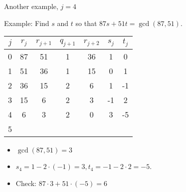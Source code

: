 \documentclass[handout]{beamer}
\begin{document}
\begin{frame}{Another example, $j=4$}

Example: Find $s$ and $t$ so that $87s+51t = \gcd(87, 51)$.

\vspace{1em}

\begin{tabular}{|c|c|c|c|c|c|c|}\hline
$j$   &  $r_{j}$    & $r_{j+1}$ & $q_{j+1}$ & $r_{j+2}$ & $s_j$ & $t_j$ \\ \hline\hline
0     &  87         &  51       &    1      &   36      &  1    &   0   \\ \hline
1     &  51         &  36       &    1      &   15      &  0    &   1   \\ \hline
2     &  36         &  15       &    2      &    6      &  1    &  -1   \\ \hline
3     &  15         &   6       &    2      &    3      & -1    &   2   \\ \hline
4     &   6         &   3       &    2      &    0      &  3    &  -5   \\ \hline
5     &             &           &           &           &       &       \\ \hline
\end{tabular}

\vspace{1em}

\begin{itemize}
  \item $\gcd(87,51) = 3$
  \item $s_4 = 1 - 2\cdot (-1) = 3, t_4 = -1 - 2\cdot 2 = -5$.
  \item Check: $87\cdot 3 + 51\cdot (-5) = 6$
\end{itemize}

\end{frame}
\end{document}
